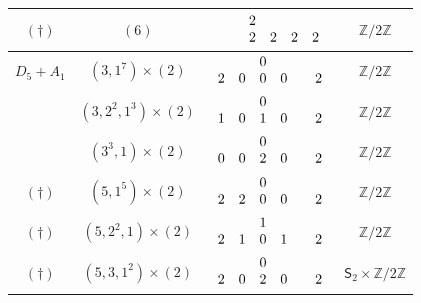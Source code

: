 \documentclass[11pt]{amsart}
\newcommand{\bZ}{{\mathbb Z}}
\newcommand{\Sym}{{\mathsf{S}}}
\numberwithin{equation}{section}
\begin{document}
\begin{center}
\begin{longtable}{|c|c|c|c|}
			$(\dagger)$ & $(6)$ & $\renewcommand{\arraystretch}{}\begin{array}{c c c c c c}
				&  & 2 & & & \\
				&  & 2 & 2 & 2 & 2   \\
			\end{array}$ & $\bZ/2\bZ$\\
			\hline
			$D_5+A_1$ & $(3,1^7)\times (2)$ & $\renewcommand{\arraystretch}{}\begin{array}{c c c c c c}
				&  & 0 & & & \\
				2 & 0 & 0 & 0  & & 2   \\
			\end{array}$ & $\bZ/2\bZ$ \\
			& $(3,2^2,1^3)\times (2)$ & $\renewcommand{\arraystretch}{}\begin{array}{c c c c c c}
				&  & 0 & & & \\
				1 & 0 & 1 & 0 & & 2   \\
			\end{array}$ & $\bZ/2\bZ$ \\
			& $(3^3,1)\times (2)$ & $\renewcommand{\arraystretch}{}\begin{array}{c c c c c c}
				&  & 0 & & & \\
				0 & 0 & 2 & 0 & & 2   \\
			\end{array}$ & $\bZ/2\bZ$ \\
			$(\dagger)$ & $(5,1^5)\times (2)$ & $\renewcommand{\arraystretch}{}\begin{array}{c c c c c c}
				&  & 0 & & & \\
				2 & 2 & 0 & 0 & & 2   \\
			\end{array}$ & $\bZ/2\bZ$ \\
			$(\dagger)$ & $(5,2^2,1)\times (2)$ & $\renewcommand{\arraystretch}{}\begin{array}{c c c c c c}
				&  & 1 & & & \\
				2 & 1 & 0 & 1 & & 2   \\
			\end{array}$ & $\bZ/2\bZ$ \\
			$(\dagger)$ & $(5,3,1^2)\times (2)$ & $\renewcommand{\arraystretch}{}\begin{array}{c c c c c c}
				&  & 0 & & & \\
				2 & 0 & 2 & 0 & & 2   \\
			\end{array}$ & $\Sym_2\times \bZ/2\bZ$ \\

\end{longtable}
\end{center}
\end{document}
